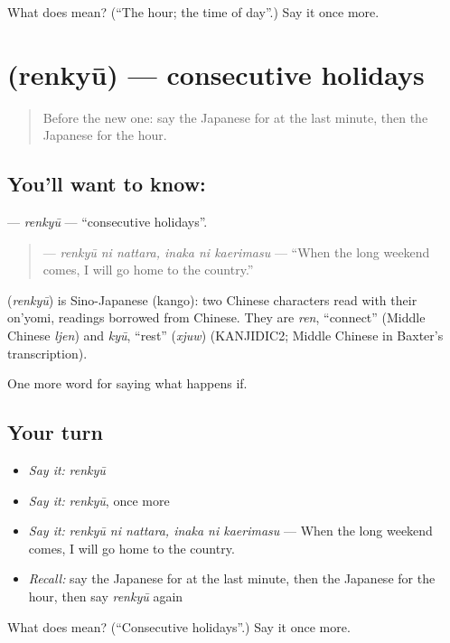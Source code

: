 \begin{tcolorbox}[breakable,colback=teal!4,colframe=teal!35!black,title={Before you move on}]
What does  mean? (\textquotedblleft{}The hour; the time of day\textquotedblright{}.) Say it once more.
\end{tcolorbox}
\section[\texorpdfstring{\ja{れんきゅう} (renkyū)}{れんきゅう (renkyū)}]{ (renkyū) — consecutive holidays}

\label{lesson:JA-C348-renkyuu}



\begin{quote}
Before the new one: say the Japanese for at the last minute, then the Japanese for the hour.
\end{quote}

\subsection*{You'll want to know: }
\textbf{} — \emph{renkyū} — \textquotedblleft{}consecutive holidays\textquotedblright{}.

\begin{quote}
\textbf{  } — \emph{renkyū ni nattara, inaka ni kaerimasu} — \textquotedblleft{}When the long weekend comes, I will go home to the country.\textquotedblright{}
\end{quote}

\begin{cousinweb}
\textbf{} (\emph{renkyū}) is Sino-Japanese (kango): two Chinese characters read with their on'yomi, readings borrowed from Chinese. They are \emph{ren}, \textquotedblleft{}connect\textquotedblright{} (Middle Chinese \emph{ljen}) and \emph{kyū}, \textquotedblleft{}rest\textquotedblright{} (\emph{xjuw}) (KANJIDIC2; Middle Chinese in Baxter's transcription).
\end{cousinweb}

\begin{grammarlens}[title={What you've built}]
One more word for saying what happens if.
\end{grammarlens}

\subsection*{Your turn}
\begin{itemize}
\raggedright
  \item \emph{Say it:} \emph{renkyū}
  \item \emph{Say it:} \emph{renkyū}, once more
  \item \emph{Say it:} \emph{renkyū ni nattara, inaka ni kaerimasu} — When the long weekend comes, I will go home to the country.
  \item \emph{Recall:} say the Japanese for at the last minute, then the Japanese for the hour, then say \emph{renkyū} again
\end{itemize}

\begin{tcolorbox}[breakable,colback=teal!4,colframe=teal!35!black,title={Before you move on}]
What does  mean? (\textquotedblleft{}Consecutive holidays\textquotedblright{}.) Say it once more.
\end{tcolorbox}
